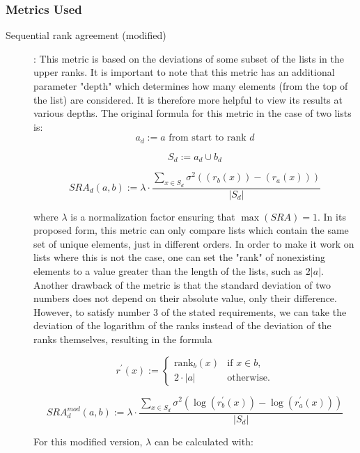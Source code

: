 \subsubsection{Metrics Used}

\begin{description}
	\item [Sequential rank agreement (modified)] \cite{ekstromSequentialRankAgreement2015}: This metric is based on the deviations of some subset of the lists in the upper ranks.
	      It is important to note that this metric has an additional parameter "depth" which determines how many elements (from the top of the list) are considered.
	      It is therefore more helpful to view its results at various depths.
	      The original formula for this metric in the case of two lists is:
	      \[
		      a_{d} := a \text{ from start to rank } d
	      \]

	      \[
		      S_{d} := a_{d} \cup b_{d}
	      \]

	      \[
		      SRA_{d}(a, b) := \lambda \cdot \frac{\sum_{x \in S_{d}} \sigma ^2 \left( \left( r_{b}(x) \right) - \left( r_{a}(x) \right) \right)}{|S_{d}|}
	      \]

	      where \(\lambda\) is a normalization factor ensuring that \(\max(SRA) = 1\).
	      In its proposed form, this metric can only compare lists which contain the same set of unique elements, just in different orders.
	      In order to make it work on lists where this is not the case, one can set the "rank" of nonexisting elements to a value greater than the length of the lists, such as \(2 |a|\).
	      Another drawback of the metric is that the standard deviation of two numbers does not depend on their absolute value, only their difference.
	      However, to satisfy number 3 of the stated requirements, we can take the deviation of the logarithm of the ranks instead of the deviation of the ranks themselves, resulting in the formula

	      \[
		      r^{\prime}(x) :=
		      \begin{cases}
			      \mathrm{rank}_{b}(x) & \text{if } x \in b, \\
			      2 \cdot |a|          & \text{otherwise.}
		      \end{cases}
	      \]

	      \[
		      SRA^{mod}_{d}(a, b) := \lambda \cdot \frac{\sum_{x \in S_{d}} \sigma ^2 \left( \log (r^{\prime}_{b}(x))-\log(r^{\prime}_{a}(x))\right)}{|S_{d}|}
	      \]

	      For this modified version, \(\lambda\) can be calculated with:


\end{description}
